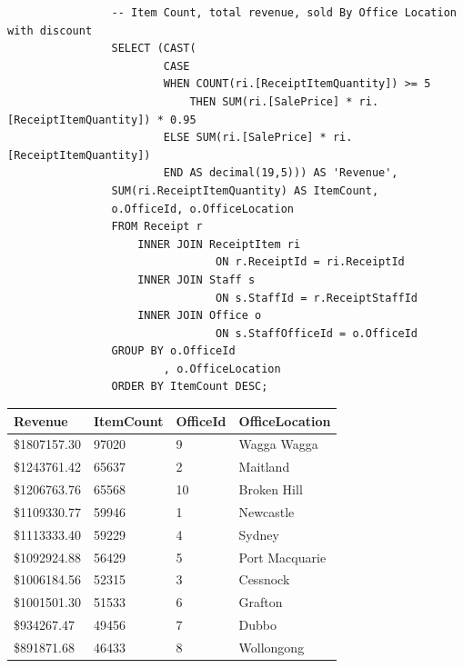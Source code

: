 \documentclass{article}
\begin{document}
                \begin{lstlisting}
                -- Item Count, total revenue, sold By Office Location with discount
                SELECT (CAST(
                        CASE
                        WHEN COUNT(ri.[ReceiptItemQuantity]) >= 5
                            THEN SUM(ri.[SalePrice] * ri.[ReceiptItemQuantity]) * 0.95
                        ELSE SUM(ri.[SalePrice] * ri.[ReceiptItemQuantity])
                        END AS decimal(19,5))) AS 'Revenue',
                SUM(ri.ReceiptItemQuantity) AS ItemCount,
                o.OfficeId, o.OfficeLocation
                FROM Receipt r
                    INNER JOIN ReceiptItem ri
                                ON r.ReceiptId = ri.ReceiptId
                    INNER JOIN Staff s
                                ON s.StaffId = r.ReceiptStaffId
                    INNER JOIN Office o
                                ON s.StaffOfficeId = o.OfficeId
                GROUP BY o.OfficeId
                        , o.OfficeLocation
                ORDER BY ItemCount DESC;
                \end{lstlisting}

                \begin{table}[H]
                    \centering
                    \begin{tabular}{|l|l|l|l|}
                    \hline
                    Revenue       & ItemCount & OfficeId & OfficeLocation \\ \hline
                    \$1807157.30 & 97020     & 9        & Wagga Wagga    \\ \hline
                    \$1243761.42 & 65637     & 2        & Maitland       \\ \hline
                    \$1206763.76 & 65568     & 10       & Broken Hill    \\ \hline
                    \$1109330.77 & 59946     & 1        & Newcastle      \\ \hline
                    \$1113333.40 & 59229     & 4        & Sydney         \\ \hline
                    \$1092924.88 & 56429     & 5        & Port Macquarie \\ \hline
                    \$1006184.56 & 52315     & 3        & Cessnock       \\ \hline
                    \$1001501.30 & 51533     & 6        & Grafton        \\ \hline
                    \$934267.47  & 49456     & 7        & Dubbo          \\ \hline
                    \$891871.68  & 46433     & 8        & Wollongong     \\ \hline
                    \end{tabular}
                \end{table}
\end{document}
